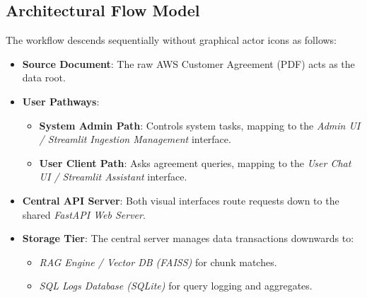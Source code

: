 \documentclass[11pt,a4paper]{article}
\begin{document}
\subsection{Architectural Flow Model}
The workflow descends sequentially without graphical actor icons as follows:
\begin{itemize}
    \item \textbf{Source Document}: The raw AWS Customer Agreement (PDF) acts as the data root.
    \item \textbf{User Pathways}:
    \begin{itemize}
        \item \textbf{System Admin Path}: Controls system tasks, mapping to the \textit{Admin UI / Streamlit Ingestion Management} interface.
        \item \textbf{User Client Path}: Asks agreement queries, mapping to the \textit{User Chat UI / Streamlit Assistant} interface.
    \end{itemize}
    \item \textbf{Central API Server}: Both visual interfaces route requests down to the shared \textit{FastAPI Web Server}.
    \item \textbf{Storage Tier}: The central server manages data transactions downwards to:
    \begin{itemize}
        \item \textit{RAG Engine / Vector DB (FAISS)} for chunk matches.
        \item \textit{SQL Logs Database (SQLite)} for query logging and aggregates.
    \end{itemize}
\end{itemize}
\end{document}
